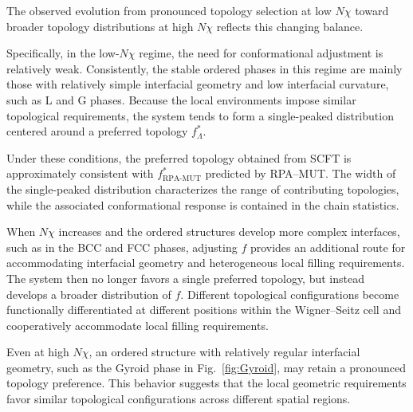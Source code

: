 The observed evolution from pronounced topology selection at low $N\chi$ toward broader topology distributions at high $N\chi$ reflects this changing balance.

Specifically, in the low-$N\chi$ regime, the need for conformational adjustment is relatively weak.
Consistently, the stable ordered phases in this regime are mainly those with relatively simple interfacial geometry and low interfacial curvature, such as L and G phases.
Because the local environments impose similar topological requirements, the system tends to form a single-peaked distribution centered around a preferred topology $f_\Lambda^\ast$.

Under these conditions, the preferred topology obtained from SCFT is approximately consistent with $f_{\mathrm{RPA\text{-}MUT}}^\ast$ predicted by RPA--MUT.
The width of the single-peaked distribution characterizes the range of contributing topologies, while the associated conformational response is contained in the chain statistics.

When $N\chi$ increases and the ordered structures develop more complex interfaces, such as in the BCC and FCC phases, adjusting $f$ provides an additional route for accommodating interfacial geometry and heterogeneous local filling requirements.
The system then no longer favors a single preferred topology, but instead develops a broader distribution of $f$.
Different topological configurations become functionally differentiated at different positions within the Wigner--Seitz cell and cooperatively accommodate local filling requirements.

Even at high $N\chi$, an ordered structure with relatively regular interfacial geometry, such as the Gyroid phase in Fig.~\ref{fig:Gyroid}, may retain a pronounced topology preference.
This behavior suggests that the local geometric requirements favor similar topological configurations across different spatial regions.



